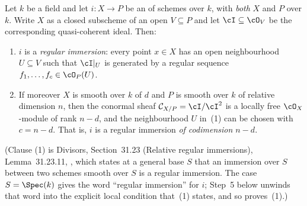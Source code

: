 \begin{lemma}
\label{lem:pc-smooth-immersion-regular}
Let $k$ be a field and let $i:X\to P$ be an
 of schemes over $k$, with
\emph{both} $X$ and $P$  over $k$.
Write $X$ as a closed subscheme of an open $V\subseteq P$ and let
$\cI\subseteq\cO_V$ be the corresponding quasi-coherent ideal.  Then:
\begin{enumerate}
\item $i$ is a \emph{regular immersion}: every point $x\in X$ has an open
neighbourhood $U\subseteq V$ such that $\cI|_U$ is generated by a regular
sequence $f_1,\dots,f_c\in\cO_P(U)$.
\item If moreover $X$ is smooth over $k$ of
 $d$ and $P$
is smooth over $k$ of relative dimension $n$, then the conormal sheaf
$\mathcal C_{X/P}=\cI/\cI^2$ is a locally free $\cO_X$-module of rank
$n-d$, and the neighbourhood $U$ in~(1) can be chosen with $c=n-d$.  That
is, $i$ is a regular immersion \emph{of codimension $n-d$}.
\end{enumerate}
(Clause (1) is Divisors, Section~31.23 (Relative regular immersions),
Lemma~31.23.11, , which states at a general base $S$
that an immersion over $S$ between two schemes smooth over $S$ is a
regular immersion.  The case $S=\Spec(k)$ gives the word ``regular
immersion'' for $i$; Step~5 below unwinds that word into the explicit
local condition that~(1) states, and so proves~(1).)
\end{lemma}
